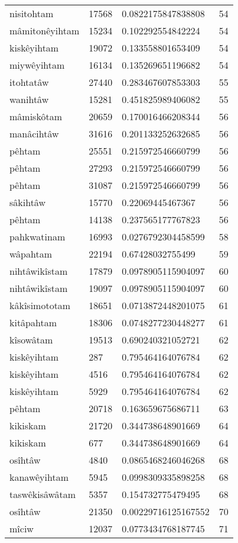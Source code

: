 \begin{longtable}{llll}
nisitohtam & 17568 & 0.0822175847838808 & 54 \\
mâmitonêyihtam & 15234 & 0.102292554842224 & 54 \\
kiskêyihtam & 19072 & 0.133558801653409 & 54 \\
miywêyihtam & 16134 & 0.135269651196682 & 54 \\
itohtatâw & 27440 & 0.283467607853303 & 55 \\
wanihtâw & 15281 & 0.451825989406082 & 55 \\
mâmiskôtam & 20659 & 0.170016466208344 & 56 \\
manâcihtâw & 31616 & 0.201133252632685 & 56 \\
pêhtam & 25551 & 0.215972546660799 & 56 \\
pêhtam & 27293 & 0.215972546660799 & 56 \\
pêhtam & 31087 & 0.215972546660799 & 56 \\
sâkihtâw & 15770 & 0.22069445467367 & 56 \\
pêhtam & 14138 & 0.237565177767823 & 56 \\
pahkwatinam & 16993 & 0.0276792304458599 & 58 \\
wâpahtam & 22194 & 0.67428032755499 & 59 \\
nihtâwikîstam & 17879 & 0.0978905115904097 & 60 \\
nihtâwikîstam & 19097 & 0.0978905115904097 & 60 \\
kâkîsimototam & 18651 & 0.0713872448201075 & 61 \\
kitâpahtam & 18306 & 0.0748277230448277 & 61 \\
kîsowâtam & 19513 & 0.690240321052721 & 62 \\
kiskêyihtam & 287 & 0.795464164076784 & 62 \\
kiskêyihtam & 4516 & 0.795464164076784 & 62 \\
kiskêyihtam & 5929 & 0.795464164076784 & 62 \\
pêhtam & 20718 & 0.163659675686711 & 63 \\
kikiskam & 21720 & 0.344738648901669 & 64 \\
kikiskam & 677 & 0.344738648901669 & 64 \\
osîhtâw & 4840 & 0.0865468246046268 & 68 \\
kanawêyihtam & 5945 & 0.0998309335898258 & 68 \\
taswêkisâwâtam & 5357 & 0.154732775479495 & 68 \\
osîhtâw & 21350 & 0.00229716125167552 & 70 \\
mîciw & 12037 & 0.0773434768187745 & 71 \\

\end{longtable}
